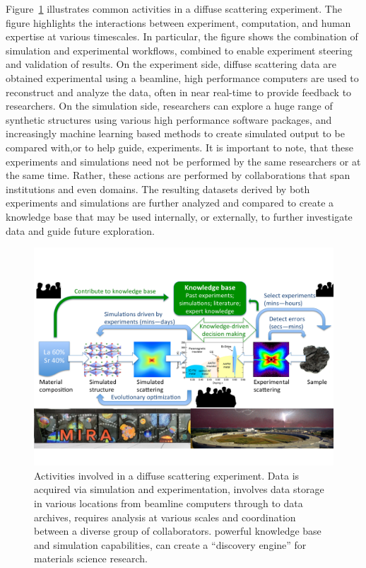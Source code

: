 \documentclass{aip-cp}
\begin{document}
Figure~\ref{fig:diffuse} illustrates common activities in a diffuse scattering experiment. 
The figure highlights the interactions between experiment, computation, and human expertise
at various timescales. In particular, the figure shows the combination of simulation and 
experimental workflows, combined to enable experiment steering and validation of results.
On the experiment side, diffuse scattering data are obtained experimental using a beamline, 
high performance computers are used to reconstruct and analyze the data, often in
near real-time to provide feedback to researchers. 
On the simulation side, researchers can explore a huge range of synthetic structures
using various high performance software packages, and increasingly machine learning
based methods to create simulated output to be compared with,or to help guide, experiments. 
It is important to note, that these experiments and simulations need not be performed
by the same researchers or at the same time. Rather, these actions are performed by
collaborations that span institutions and even domains. 
The resulting datasets derived by both experiments and simulations are further analyzed
and compared to create a knowledge base that may be used internally, or externally, 
to further investigate data and guide future exploration.

\begin{figure}[h]
  \centerline{\includegraphics[width=6in,trim=0 2.6in 0 1.5in,clip]{Figs/diffuse.png}}
  \caption{Activities involved in a diffuse scattering experiment. Data is acquired
   via simulation and experimentation, involves data storage in various locations
from beamline computers through to data archives, requires analysis at various scales
and coordination between a diverse group of collaborators. 
powerful knowledge base and simulation capabilities, can create a ``discovery engine'' for materials 
science research. 
\label{fig:diffuse}}
\end{figure}
\end{document}
